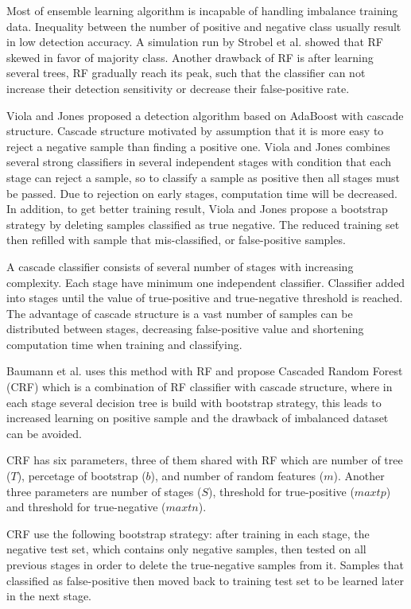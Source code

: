 Most of ensemble learning algorithm is incapable of handling imbalance training
data.
Inequality between the number of positive and negative class usually result in
low detection accuracy.
A simulation run by Strobel et al. \cite{strobl2007bias} showed that RF skewed
in favor of majority class.
Another drawback of RF is after learning several trees, RF gradually reach its
peak, such that the classifier can not increase their detection sensitivity or
decrease their false-positive rate.

Viola and Jones \cite{viola2004robust} proposed a detection algorithm based on
AdaBoost with cascade structure.
Cascade structure motivated by assumption that it is more easy to reject a
negative sample than finding a positive one.
Viola and Jones combines several strong classifiers in several independent
stages with condition that each stage can reject a sample, so to classify a
sample as positive then all stages must be passed.
Due to rejection on early stages, computation time will be decreased.
In addition, to get better training result, Viola and Jones propose a bootstrap
strategy by deleting samples classified as true negative.
The reduced training set then refilled with sample that mis-classified, or
false-positive samples.

A cascade classifier consists of several number of stages with increasing
complexity.
Each stage have minimum one independent classifier.
Classifier added into stages until the value of true-positive and true-negative
threshold is reached.
The advantage of cascade structure is a vast number of samples can be
distributed between stages, decreasing false-positive value and shortening
computation time when training and classifying.

Baumann et al. \cite{baumann2013cascaded} uses this method with RF and propose
Cascaded Random Forest (CRF) which is a combination of RF classifier with
cascade structure, where in each stage several decision tree is build with
bootstrap strategy, this leads to increased learning on positive sample and the
drawback of imbalanced dataset can be avoided.

CRF has six parameters, three of them shared with RF which are number of tree
($T$), percetage of bootstrap ($b$), and number of random features ($m$).
Another three parameters are number of stages ($S$), threshold
for true-positive ($maxtp$) and threshold for true-negative ($maxtn$).

CRF use the following bootstrap strategy: after training in each stage, the
negative test set, which contains only negative samples, then tested on all
previous stages in order to delete the true-negative samples from it.
Samples that classified as false-positive then moved back to training test set
to be learned later in the next stage.


